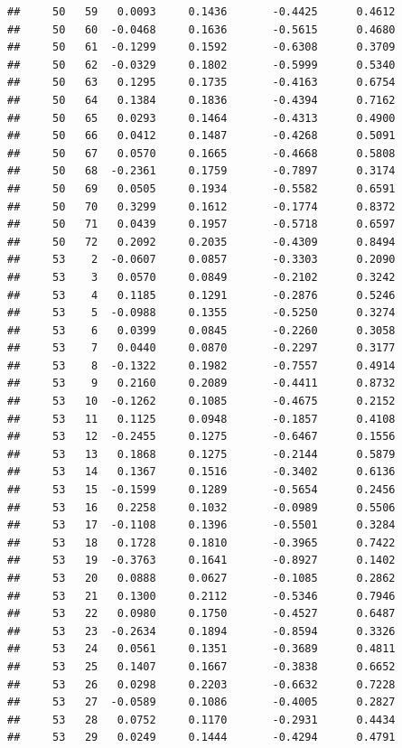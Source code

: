 \documentclass[
]{article}
\begin{document}
\begin{verbatim}
##     50   59   0.0093     0.1436       -0.4425      0.4612  
##     50   60  -0.0468     0.1636       -0.5615      0.4680  
##     50   61  -0.1299     0.1592       -0.6308      0.3709  
##     50   62  -0.0329     0.1802       -0.5999      0.5340  
##     50   63   0.1295     0.1735       -0.4163      0.6754  
##     50   64   0.1384     0.1836       -0.4394      0.7162  
##     50   65   0.0293     0.1464       -0.4313      0.4900  
##     50   66   0.0412     0.1487       -0.4268      0.5091  
##     50   67   0.0570     0.1665       -0.4668      0.5808  
##     50   68  -0.2361     0.1759       -0.7897      0.3174  
##     50   69   0.0505     0.1934       -0.5582      0.6591  
##     50   70   0.3299     0.1612       -0.1774      0.8372  
##     50   71   0.0439     0.1957       -0.5718      0.6597  
##     50   72   0.2092     0.2035       -0.4309      0.8494  
##     53    2  -0.0607     0.0857       -0.3303      0.2090  
##     53    3   0.0570     0.0849       -0.2102      0.3242  
##     53    4   0.1185     0.1291       -0.2876      0.5246  
##     53    5  -0.0988     0.1355       -0.5250      0.3274  
##     53    6   0.0399     0.0845       -0.2260      0.3058  
##     53    7   0.0440     0.0870       -0.2297      0.3177  
##     53    8  -0.1322     0.1982       -0.7557      0.4914  
##     53    9   0.2160     0.2089       -0.4411      0.8732  
##     53   10  -0.1262     0.1085       -0.4675      0.2152  
##     53   11   0.1125     0.0948       -0.1857      0.4108  
##     53   12  -0.2455     0.1275       -0.6467      0.1556  
##     53   13   0.1868     0.1275       -0.2144      0.5879  
##     53   14   0.1367     0.1516       -0.3402      0.6136  
##     53   15  -0.1599     0.1289       -0.5654      0.2456  
##     53   16   0.2258     0.1032       -0.0989      0.5506  
##     53   17  -0.1108     0.1396       -0.5501      0.3284  
##     53   18   0.1728     0.1810       -0.3965      0.7422  
##     53   19  -0.3763     0.1641       -0.8927      0.1402  
##     53   20   0.0888     0.0627       -0.1085      0.2862  
##     53   21   0.1300     0.2112       -0.5346      0.7946  
##     53   22   0.0980     0.1750       -0.4527      0.6487  
##     53   23  -0.2634     0.1894       -0.8594      0.3326  
##     53   24   0.0561     0.1351       -0.3689      0.4811  
##     53   25   0.1407     0.1667       -0.3838      0.6652  
##     53   26   0.0298     0.2203       -0.6632      0.7228  
##     53   27  -0.0589     0.1086       -0.4005      0.2827  
##     53   28   0.0752     0.1170       -0.2931      0.4434  
##     53   29   0.0249     0.1444       -0.4294      0.4791  

\end{verbatim}
\end{document}
